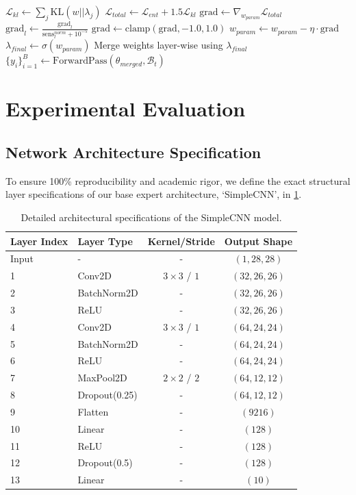 \documentclass{article}
\begin{document}
\begin{algorithm}[tb]
\begin{algorithmic}[1]
    \STATE $\mathcal{L}_{kl} \leftarrow \sum_j \text{KL}(w || \lambda_j)$
    \STATE $\mathcal{L}_{total} \leftarrow \mathcal{L}_{ent} + 1.5 \mathcal{L}_{kl}$
    \STATE $\text{grad} \leftarrow \nabla_{w_{param}} \mathcal{L}_{total}$
    \STATE $\text{grad}_l \leftarrow \frac{\text{grad}_l}{\text{sens}_l^{norm} + 10^{-5}}$ 
    \STATE $\text{grad} \leftarrow \text{clamp}(\text{grad}, -1.0, 1.0)$
    \STATE $w_{param} \leftarrow w_{param} - \eta \cdot \text{grad}$
\ENDFOR
\STATE $\lambda_{final} \leftarrow \sigma(w_{param})$
\STATE Merge weights layer-wise using $\lambda_{final}$
\STATE $\{y_i\}_{i=1}^B \leftarrow \text{ForwardPass}(\theta_{merged}, \mathcal{B}_t)$
\end{algorithmic}
\end{algorithm}

\section{Experimental Evaluation}
\label{sec:eval}

\subsection{Network Architecture Specification}
To ensure 100\% reproducibility and academic rigor, we define the exact structural layer specifications of our base expert architecture, `SimpleCNN', in \cref{tab:architecture}.

\begin{table}[h]
\caption{Detailed architectural specifications of the SimpleCNN model.}
\label{tab:architecture}
\begin{center}
\begin{footnotesize}
\begin{tabular}{llcc}
\toprule
Layer Index & Layer Type & Kernel/Stride & Output Shape \\
\midrule
Input & - & - & $(1, 28, 28)$ \\
1 & Conv2D & $3\times3$ / $1$ & $(32, 26, 26)$ \\
2 & BatchNorm2D & - & $(32, 26, 26)$ \\
3 & ReLU & - & $(32, 26, 26)$ \\
4 & Conv2D & $3\times3$ / $1$ & $(64, 24, 24)$ \\
5 & BatchNorm2D & - & $(64, 24, 24)$ \\
6 & ReLU & - & $(64, 24, 24)$ \\
7 & MaxPool2D & $2\times2$ / $2$ & $(64, 12, 12)$ \\
8 & Dropout(0.25) & - & $(64, 12, 12)$ \\
9 & Flatten & - & $(9216)$ \\
10 & Linear & - & $(128)$ \\
11 & ReLU & - & $(128)$ \\
12 & Dropout(0.5) & - & $(128)$ \\
13 & Linear & - & $(10)$ \\
\bottomrule
\end{tabular}
\end{footnotesize}
\end{center}
\end{table}
\end{document}
